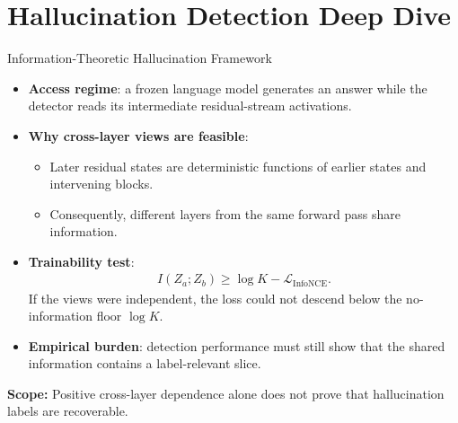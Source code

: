 \documentclass[aspectratio=1610]{beamer}
\newcommand{\sectionpubinfo}{}
\newcommand{\scopefooter}[1]{%
  \vfill
  \begin{center}
    \footnotesize\textbf{Scope:} #1
  \end{center}%
}
\begin{document}
\renewcommand{\sectionpubinfo}{\hspace{1ex}(Chapter 6 --- In preparation, 2026)}
\section{Hallucination Detection Deep Dive}

\begin{frame}{Information-Theoretic Hallucination Framework}
\begin{itemize}
  \item \textbf{Access regime}: a frozen language model generates an answer while the detector reads its intermediate residual-stream activations.
  \item \textbf{Why cross-layer views are feasible}:
  \begin{itemize}
    \item Later residual states are deterministic functions of earlier states and intervening blocks.
    \item Consequently, different layers from the same forward pass share information.
  \end{itemize}
  \item \textbf{Trainability test}:
  \begin{align*}
    I(Z_a;Z_b)\ge \log K-\mathcal{L}_{\mathrm{InfoNCE}}.
  \end{align*}
  If the views were independent, the loss could not descend below the no-information floor $\log K$.
  \item \textbf{Empirical burden}: detection performance must still show that the shared information contains a label-relevant slice.
\end{itemize}
\scopefooter{Positive cross-layer dependence alone does not prove that hallucination labels are recoverable.}
\end{frame}
\end{document}

